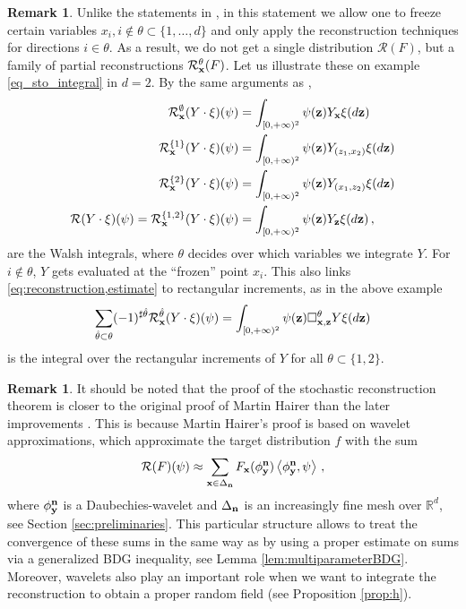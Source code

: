 \documentclass[12pt]{article}
\numberwithin{equation}{section}
\theoremstyle{plain}
\theoremstyle{definition}
\newtheorem{remark}[theorem]{Remark}
\newcommand{\scalar}[1]{\left\langle #1 \right\rangle}
\def\cR{\mathcal{R}}\def\cE{\mathcal{E}}
\def\bR{\mathbb{R}}\def\bS{\mathbb{S}}
\def\fy{\mathbf y}\def\fz{\mathbf z}
\begin{document}
\begin{remark}
    Unlike the statements in \cite{zambotti2020,kern2021}, in this statement we allow one to freeze certain variables $x_i, i\notin\theta\subset\{1,\dots,d\}$ and only apply the reconstruction techniques for directions $i\in\theta$. As a result, we do not get a single distribution $\cR(F)$, but a family of partial reconstructions $\cR^\theta_\fx(F)$. Let us illustrate these on example \eqref{eq_sto_integral} in $d=2$. By the same arguments as \cite[Theorem 53]{kern2021},
    \begin{align*}
        \cR^\emptyset_\fx(Y\cdot\xi)(\psi) &= \int_{[0,+\infty)^2} \psi(\fz)Y_\fx\xi(d\fz) \\
        \cR^{\{1\}}_\fx(Y\cdot\xi)(\psi) &= \int_{[0,+\infty)^2} \psi(\fz)Y_{(z_1,x_2)}\xi(d\fz)\\
        \cR^{\{2\}}_\fx(Y\cdot\xi)(\psi) &= \int_{[0,+\infty)^2} \psi(\fz)Y_{(x_1,z_2)}\xi(d\fz)\\
        \cR(Y\cdot\xi)(\psi) = \cR^{\{1,2\}}_\fx(Y\cdot\xi)(\psi) &= \int_{[0,+\infty)^2} \psi(\fz)Y_\fz\xi(d\fz)\,,
    \end{align*}
    are the Walsh integrals, where $\theta$ decides over which variables we integrate $Y$. For $i\notin\theta$, $Y$ gets evaluated at the ``frozen'' point $x_i$. This also links \eqref{eq:reconstruction,estimate} to rectangular increments, as in the above example
    \[
        \sum_{\hat\theta \subset\theta}(-1)^{\sharp{\hat\theta}} \mathcal{R} ^{\hat\theta}_\fx(Y\cdot\xi)(\psi) = \int_{[0,+\infty)^2} \psi(\fz)\square^\theta_{\fx,\fz} Y \xi(d\fz)
    \]
    is the integral over the rectangular increments of $Y$ for all $\theta\subset\{1,2\}$.
\end{remark}
\begin{remark}
It should be noted that the proof of the stochastic reconstruction theorem is closer to the original proof of Martin Hairer than the later improvements \cite{zambotti2020,Broux2023,ZorinKranich2022}.  This is because Martin Hairer's proof is based on wavelet approximations, which approximate the target distribution $f$ with the  sum
\begin{equation}\label{eq:approx_reconstruction}
\mathcal{R}(F)(\psi) \approx \sum_{\fx\in\Delta_\fn} F_\fx(\phi^\fn_\fy)\scalar{\phi^\fn_\fy,\psi}\,,
\end{equation}
where $\phi^\fn_\fy$ is a Daubechies-wavelet and $\Delta_\mathbf n$ is an increasingly fine mesh over $\bR^d$, see Section \ref{sec:preliminaries}. This particular structure allows to treat the convergence of these sums in the same way as  \cite{le2020} by using a proper estimate on sums via a generalized BDG inequality, see Lemma \ref{lem:multiparameterBDG}. Moreover, wavelets also play an important role when we want to integrate the reconstruction to obtain a proper random field (see Proposition \ref{prop:h}).
\end{remark}
\end{document}
